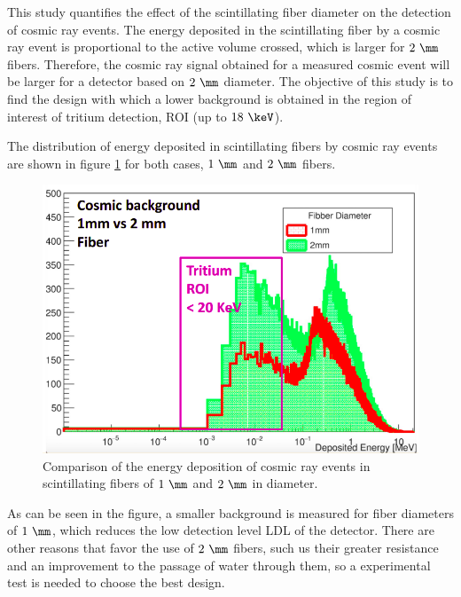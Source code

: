 This study quantifies the effect of the scintillating fiber diameter on the detection of cosmic ray events. The energy deposited in the scintillating fiber by a cosmic ray event is proportional to the active volume crossed, which is larger for $2~\mm$ fibers. Therefore, the cosmic ray signal obtained for a measured cosmic event will be larger for a detector based on $2~\mm$ diameter. The objective of this study is to find the design with which a lower background is obtained in the region of interest of tritium detection, ROI (up to $18~\keV$).

The distribution of energy deposited in scintillating fibers by cosmic ray events are shown in figure \ref{fig:DiameterComparison} for both cases, $1~\mm$ and $2~\mm$ fibers.

\begin{figure}[hbtp]
\centering
\includegraphics[scale=0.4]{Figures/8SimulationsResults/81TRITIUMDesign/814Diameter/ComparisonDiameter.png}
\caption{Comparison of the energy deposition of cosmic ray events in scintillating fibers of $1~\mm$ and $2~\mm$ in diameter.\label{fig:DiameterComparison}}
\end{figure}

As can be seen in the figure, a smaller background is measured for fiber diameters of $1~\mm$, which reduces the low detection level LDL of the detector. There are other reasons that favor the use of $2~\mm$ fibers, such us their greater resistance and an improvement to the passage of water through them, so a experimental test is needed to choose the best design.


